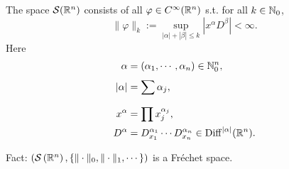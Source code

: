 \begin{definition}
	The space $\mathcal{S}(\mathbb{R}^{n})$ consists of all $\varphi \in C^{\infty}(\mathbb{R}^{n})$ s.t. for all $k \in \mathbb{N}_0$,
	\[
	\|\varphi\|_k:=\sup_{|\alpha |+|\beta |\le k}\left| x^{\alpha }D^{\beta } \right| <\infty.
	\] 
	Here 
	\begin{equation*}
		\begin{aligned}
			\alpha &=(\alpha _1,\cdots ,\alpha _n)\in \mathbb{N}_0^{n},\\
			|\alpha |&=\sum_{}^{} \alpha _j,\\
			x^{\alpha }&=\prod x_j^{\alpha _j},\\
			D^{\alpha }&=D_{x_1}^{\alpha _1}\cdots D_{x_n}^{\alpha _n}\in \mathrm{Diff}^{|\alpha |}(\mathbb{R}^{n}).
		\end{aligned} 
	\end{equation*}
\end{definition}
Fact: $\left( \mathcal{S}\left( \mathbb{R}^{n} \right) , \left\{\|\cdot \|_0,\|\cdot \|_1,\cdots \right\}  \right) $ is a Fréchet space. \\

